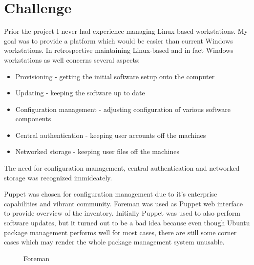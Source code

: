 \documentclass{article}
\begin{document}
\section{Challenge}

Prior the project I never had experience managing Linux based workstations.
My goal was to provide a platform which would be easier than current Windows
workstations.
In retrospective maintaining Linux-based and in fact
Windows workstations as well concerns several aspects:

\begin{itemize}
\item Provisioning - getting the initial software setup onto the computer
\item Updating - keeping the software up to date
\item Configuration management - adjusting configuration of various software components
\item Central authentication - keeping user accounts off the machines
\item Networked storage - keeping user files off the machines
\end{itemize}

The need for configuration management, central authentication
and networked storage was recognized immideately.


Puppet was chosen for configuration management due to it's
enterprise capabilities and vibrant community.
Foreman was used as Puppet web interface to provide
overview of the inventory.
Initially Puppet was used to also perform software updates, but
it turned out to be a bad idea because even though Ubuntu package
management performs well for most cases, there are still some
corner cases which may render the whole package management
system unusable.

\begin{figure}[!htb]
\centering
{}
\caption{Foreman}
\label{fig:digraph}
\end{figure}
\end{document}
